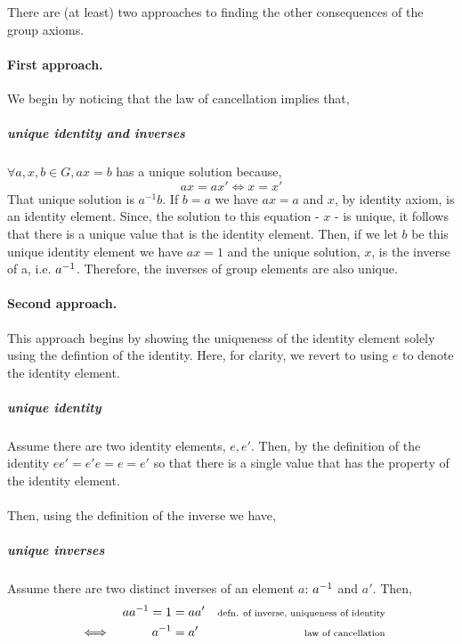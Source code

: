\documentclass[MathsNotesBase.tex]{subfiles}
\begin{document}
{		\bigskip\bigskip
		There are (at least) two approaches to finding the other consequences of the group axioms.
		\paragraph*{First approach.} We begin by noticing that the law of cancellation implies that,
		\subparagraph*{unique identity and inverses}$\forall a,x,b \in G, ax = b$ has a unique solution because,
		\[ ax = ax' \iff x = x' \]
		That unique solution is $a^{-1}b$. If $b=a$ we have $ax=a$ and $x$, by identity axiom, is an identity element. Since, the solution to this equation - $x$ - is unique, it follows that there is a unique value that is the identity element. Then, if we let $b$ be this unique identity element we have $ax=1$ and the unique solution, $x$, is the inverse of a, i.e. ${a}^{-1}$. Therefore, the inverses of group elements are also unique.
		
		\paragraph*{Second approach.} This approach begins by showing the uniqueness of the identity element solely using the defintion of the identity. Here, for clarity, we revert to using $e$ to denote the identity element.
		\subparagraph*{unique identity} Assume there are two identity elements, $e, e'$. Then, by the definition of the identity $ee' = e'e = e = e'$ so that there is a single value that has the property of the identity element.\\\\
		Then, using the definition of the inverse we have,
		\subparagraph{unique inverses} Assume there are two distinct inverses of an element $a$: ${a}^{-1}$ and $a'$. Then, 
		\begin{align*}
		&& a{a}^{-1} = 1 &= aa' &\text{\scriptsize{defn. of inverse, uniqueness of identity}}\\
		& \iff & {a}^{-1} &= a' &\text{\scriptsize{law of cancellation}}
		\end{align*}
		\bigskip\bigskip

}
\end{document}
